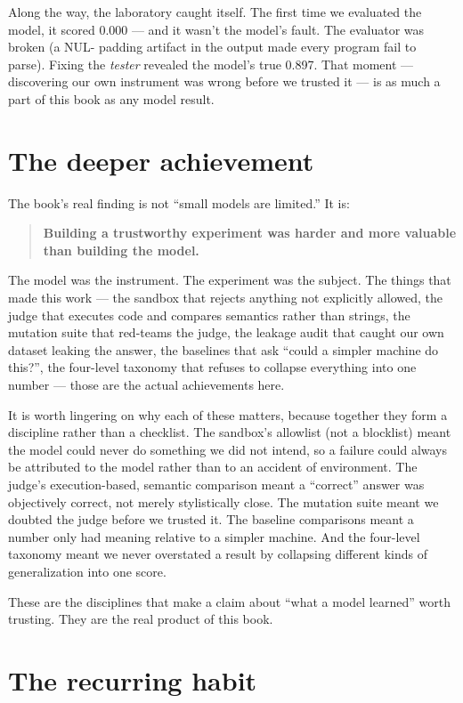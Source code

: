 Along the way, the laboratory caught itself. The first time we evaluated
the model, it scored 0.000 --- and it wasn't the model's fault. The
evaluator was broken (a NUL- padding artifact in the output made every
program fail to parse). Fixing the \emph{ tester} revealed the model's
true 0.897. That moment --- discovering our own instrument was wrong
before we trusted it --- is as much a part of this book as any model
result.

\section{The deeper achievement}\label{the-deeper-achievement}

The book's real finding is not ``small models are limited.'' It is:

\begin{quote}
\textbf{Building a trustworthy experiment was harder and more valuable
than building the model.}
\end{quote}

The model was the instrument. The experiment was the subject. The things
that made this work --- the sandbox that rejects anything not explicitly
allowed, the judge that executes code and compares semantics rather than
strings, the mutation suite that red-teams the judge, the leakage audit
that caught our own dataset leaking the answer, the baselines that ask
``could a simpler machine do this?'', the four-level taxonomy that
refuses to collapse everything into one number --- those are the actual
achievements here.

It is worth lingering on why each of these matters, because together
they form a discipline rather than a checklist. The sandbox's allowlist
(not a blocklist) meant the model could never do something we did not
intend, so a failure could always be attributed to the model rather than
to an accident of environment. The judge's execution-based, semantic
comparison meant a ``correct'' answer was objectively correct, not
merely stylistically close. The mutation suite meant we doubted the
judge before we trusted it. The baseline comparisons meant a number only
had meaning relative to a simpler machine. And the four-level taxonomy
meant we never overstated a result by collapsing different kinds of
generalization into one score.

These are the disciplines that make a claim about ``what a model
learned'' worth trusting. They are the real product of this book.

\section{The recurring habit}\label{the-recurring-habit}

